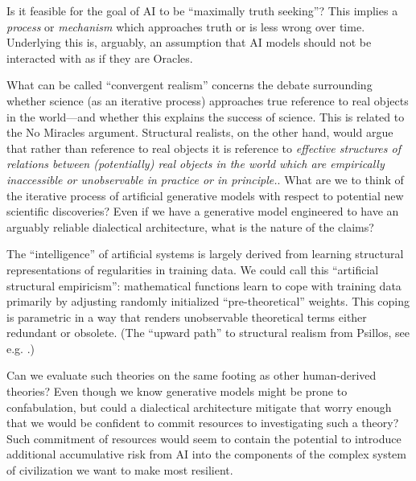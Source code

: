 \documentclass[11pt, oneside]{article}   	%
\begin{document}
Is it feasible for the goal of AI to be ``maximally truth seeking''?  This implies a \emph{process} or \emph{mechanism} which approaches truth or is less wrong over time.  Underlying this is, arguably, an assumption that AI models should not be interacted with as if they are Oracles.  



What can be called ``convergent realism'' concerns the debate surrounding whether science (as an iterative process) approaches true reference to real objects in the world---and whether this explains the success of science.  This is related to the No Miracles argument.  Structural realists, on the other hand, would argue that rather than reference to real objects it is reference to \emph{effective structures of relations between (potentially) real objects in the world which are empirically inaccessible or unobservable in practice or in principle.}.  What are we to think of the iterative process of artificial generative models with respect to potential new scientific discoveries? Even if we have a generative model engineered to have an arguably reliable dialectical architecture, what is the nature of the claims?  

The ``intelligence'' of artificial systems is largely derived from learning structural representations of regularities in training data. We could call this ``artificial structural empiricism'': mathematical functions learn to cope with training data primarily by adjusting randomly initialized ``pre-theoretical'' weights.  This coping is parametric in a way that renders unobservable theoretical terms either redundant or obsolete.  (The ``upward path'' to structural realism from Psillos, see e.g. \citep[\S 3]{sep-structural-realism}.)

Can we evaluate such theories on the same footing as other human-derived theories?  Even though we know generative models might be prone to confabulation, but could a dialectical architecture mitigate that worry enough that we would be confident to commit resources to investigating such a theory?  Such commitment of resources would seem to contain the potential to introduce additional accumulative risk from AI into the components of the complex system of civilization we want to make most resilient.


\end{document}
